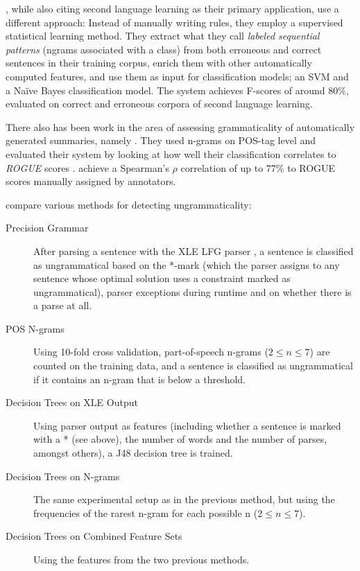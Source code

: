 \documentclass[a4paper,10pt]{scrartcl}
\theoremstyle{style}
\begin{document}
\cite{sun2007detecting}, while also citing second language learning as their primary application, use a different approach: Instead of manually writing rules, they employ a supervised statistical learning method. They extract what they call \textit{labeled sequential patterns} (ngrams associated with a class) from both erroneous and correct sentences in their training corpus, enrich them with other automatically computed features, and use them as input for classification models; an SVM \citep[SVMlight,][]{Joachims/02a} and a Na\"ive Bayes classification model. The system achieves F-scores of around 80\%, evaluated on correct and erroneous corpora of second language learning.

There also has been work in the area of assessing grammaticality of automatically generated summaries, namely \cite{vadlapudi2010automated}. They used n-grams on POS-tag level and evaluated their system by looking at how well their classification correlates to \textit{ROGUE} scores \citep{lin2004rouge}. \citeauthor{vadlapudi2010automated} achieve a Spearman's $\rho{}$ correlation of up to 77\% to ROGUE scores manually assigned by annotators.

\cite{wagner2007comparative} compare various methods for detecting ungrammaticality:

\begin{description}
	\item[Precision Grammar] After parsing a sentence with the XLE LFG parser \citep{maxwell1996efficient}, a sentence is classified as ungrammatical based on the *-mark (which the parser assigns to any sentence whose optimal solution uses a constraint marked as ungrammatical), parser exceptions during runtime and on whether there is a parse at all.
	\item[POS N-grams] Using 10-fold cross validation, part-of-speech n-grams ($2 \leq n \leq 7$) are counted on the training data, and a sentence is classified as ungrammatical if it contains an n-gram that is below a threshold.
	\item[Decision Trees on XLE Output] Using parser output as features (including whether a sentence is marked with a * (see above), the number of words and the number of parses, amongst others), a J48 decision tree is trained.
	\item[Decision Trees on N-grams] The same experimental setup as in the previous method, but using the frequencies of the rarest n-gram for each possible n ($2 \leq n \leq 7$).
	\item[Decision Trees on Combined Feature Sets] Using the features from the two previous methods.
\end{description}
\end{document}
